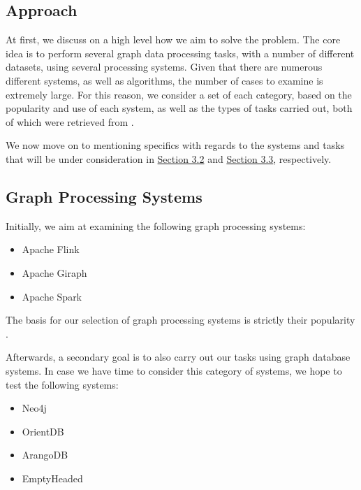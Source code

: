 \documentclass[a4paper,11pt]{article}
\begin{document}
\subsection{Approach} \label{approach}

\par At first, we discuss on a high level how we aim to solve the problem. The core idea is to perform several graph data processing tasks, with a number of different datasets, using several processing systems. Given that there are numerous different systems, as well as algorithms, the number of cases to examine is extremely large. For this reason, we consider a set of each category, based on the popularity and use of each system, as well as the types of tasks carried out, both of which were retrieved from \cite{survey}.

\medskip

\par We now move on to mentioning specifics with regards to the systems and tasks that will be under consideration in \hyperref[graph-proc]{Section 3.2}  and \hyperref[algos]{Section 3.3}, respectively.


\subsection{Graph Processing Systems} \label{graph-proc}

\par Initially, we aim at examining the following graph processing systems:

\begin{itemize}

	\item Apache Flink \cite{flink}
	\item Apache Giraph \cite{giraph}
	\item Apache Spark \cite{spark}

\end{itemize}

\par The basis for our selection of graph processing systems is strictly their popularity \cite{survey}.

\medskip

\par Afterwards, a secondary goal is to also carry out our tasks using graph database systems. In case we have time to consider this category of systems, we hope to test the following systems:

\begin{itemize}

	\item Neo4j \cite{neo4j}
	\item OrientDB \cite{orientdb}
	\item ArangoDB \cite{arangodb}
	\item EmptyHeaded \cite{emptyheaded} \cite{emptyheadedgit}

\end{itemize}
\end{document}
